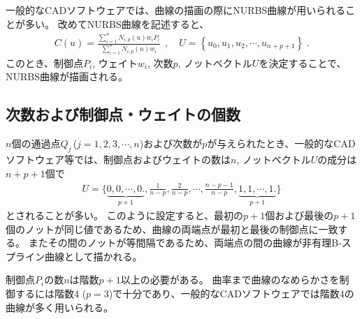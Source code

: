 \clearpage
一般的なCADソフトウェアでは、曲線の描画の際にNURBS曲線が用いられることが多い。
改めてNURBS曲線を記述すると、
\begin{align*}
  C(u) = \frac{\displaystyle\sum_{i=1}^nN_{i, p}(u)w_iP_i}{\displaystyle\sum_{i=1}^nN_{i, p}(u)w_i}~~,\quad
  U = \left\{u_0, u_1, u_2, \cdots, u_{n+p+1}\right\}\ .
\end{align*}
このとき、制御点$P_i$, ウェイト$w_i$, 次数$p$, ノットベクトル$U$を決定することで、NURBS曲線が描画される。


\subsection{次数および制御点・ウェイトの個数}
$n$個の通過点$Q_j$\,($j = 1, 2, 3, \cdots, n$)および次数が$p$が与えられたとき、一般的なCADソフトウェア等では、制御点およびウェイトの数は$n$, ノットベクトル$U$の成分は$n+p+1$個で
\begin{align*}
  U = \bigg\{
      \underbrace{0, 0, \cdots, 0\bigg.}_{p+1},
      \frac1{n-p}, \frac2{n-p}, \cdots, \frac{n-p-1}{n-p},
      \underbrace{1, 1, \cdots, 1\bigg.}_{p+1}
      \bigg\}
\end{align*}
とされることが多い。
このように設定すると、最初の$p+1$個および最後の$p+1$個のノットが同じ値であるため、曲線の両端点が最初と最後の制御点に一致する。
またその間のノットが等間隔であるため、両端点の間の曲線が非有理B-スプライン曲線として描かれる。
\begin{hosoku}
制御点$P_i$の数$n$は階数$p+1$以上の必要がある。
曲率まで曲線のなめらかさを制御するには階数4 ($p = 3$)で十分であり、一般的なCADソフトウェアでは階数4の曲線が多く用いられる。
\end{hosoku}


